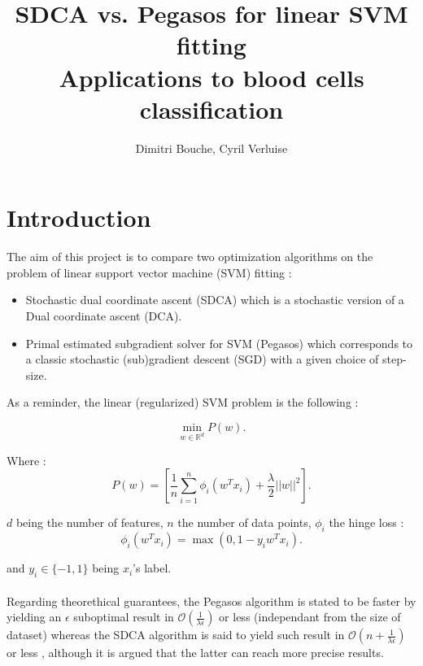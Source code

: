 \documentclass[10pt,a4paper]{article}
\begin{document}
\title{%
  SDCA \cite{2} vs. Pegasos \cite{1} for linear SVM fitting \\
  \large Applications to blood cells classification}

\author{Dimitri Bouche, Cyril Verluise}

\maketitle

\tableofcontents
\newpage

\section{Introduction}

The aim of this project is to compare two optimization algorithms on the problem of linear support vector machine (SVM) fitting :

\begin{itemize}
	\item Stochastic dual coordinate ascent (SDCA) \cite{2} which is a stochastic version of a Dual coordinate ascent (DCA).
	\item Primal estimated subgradient solver for SVM (Pegasos) \cite{1} which corresponds to a classic stochastic (sub)gradient descent (SGD) with a given choice of step-size.
\end{itemize}

As a reminder, the linear (regularized) SVM problem is the following :

\begin{equation}\label{P}
\min_{w \in \mathbb{R}^d} P(w).
\end{equation}

Where : $$P(w) = \left [ \frac{1}{n} \sum_{i=1}^n \phi_i (w^T x_i) + \frac{\lambda}{2} || w ||^2 \right ].$$


$d$ being the number of features, $n$ the number of data points, $\phi_i$ the hinge loss : 
$$\phi_i(w^T x_i) = \max(0, 1 - y_iw^Tx_i).$$

and $y_i \in \{-1, 1\}$ being $x_i$'s label.

\paragraph{}

Regarding theorethical guarantees, the Pegasos algorithm is stated to be faster by \cite{1} yielding an $\epsilon$ suboptimal result in $\mathcal{O}(\frac{1}{\lambda \epsilon})$ or less (independant from the size of dataset) whereas the SDCA algorithm is said to yield such result in $\mathcal{O}(n + \frac{1}{\lambda \epsilon})$ or less \cite{2}, although it is argued that the latter can reach more precise results.
\end{document}
